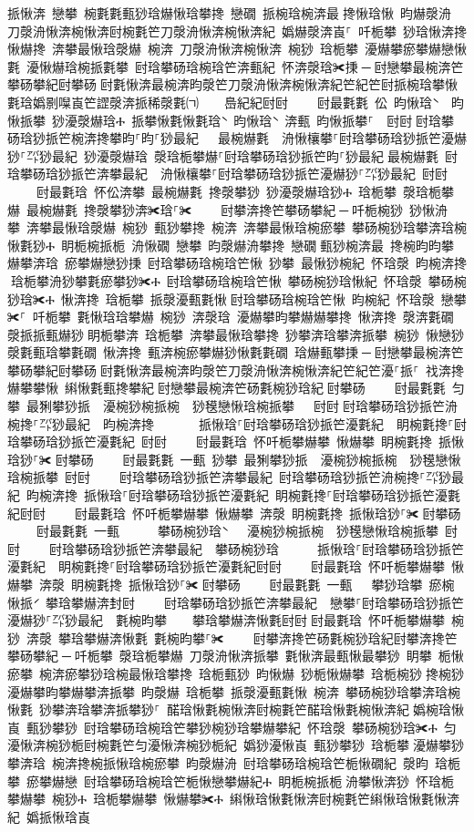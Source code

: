 ﻿\documentclass[output=paper]{langsci/langscibook}
\begin{document}
\begin{exe}
{\begin{exe}
挀愀渀 戀攀 椀氀氀甀猀琀爀愀琀攀搀 戀礀 挀椀琀椀渀最਀搀愀琀愀 昀爀漀洀 刀漀洀愀渀椀愀渀尀椀氀笀刀漀洀愀渀椀愀渀紀 嬀爀漀渀崀⸀ 吀栀攀 猀琀愀渀搀愀爀搀 渀攀最愀琀漀爀 椀渀 刀漀洀愀渀椀愀渀 椀猀 琀栀攀 瀀爀攀瘀攀爀戀愀氀 瀀愀爀琀椀挀氀攀 尀琀攀砀琀椀琀笀渀甀紀 怀渀漀琀✀㨀਀─਀尀戀攀最椀渀笀攀砀攀紀尀攀砀਀尀氀愀渀最椀渀昀漀笀刀漀洀愀渀椀愀渀紀笀紀笀尀挀椀琀攀愀氀琀嬀㔀㘀崀笀䜀漀渀挀稀漀氀㈀　　㠀紀紀尀尀਀    尀最氀氀 伀 昀愀琀̀  昀愀挀攀 猀瀀漀爀琀Ⰰ 挀攀愀氀愀氀琀̀ 昀愀琀̀ 渀甀 昀愀挀攀⸀  尀尀਀尀琀攀砀琀猀挀笀椀渀搀攀昀⸀昀⸀猀最紀   最椀爀氀  洀愀欀攀⸀尀琀攀砀琀猀挀笀瀀爀猀⸀㌀猀最紀 猀瀀漀爀琀 漀琀栀攀爀⸀尀琀攀砀琀猀挀笀昀⸀猀最紀਀最椀爀氀 尀琀攀砀琀猀挀笀渀攀最紀  洀愀欀攀⸀尀琀攀砀琀猀挀笀瀀爀猀⸀㌀猀最紀 尀尀਀    尀最氀琀 怀伀渀攀 最椀爀氀 搀漀攀猀 猀瀀漀爀琀猀Ⰰ 琀栀攀 漀琀栀攀爀 最椀爀氀 搀漀攀猀渀✀琀⸀✀਀    尀攀渀搀笀攀砀攀紀਀─਀吀栀椀猀 猀愀洀攀 渀攀最愀琀漀爀 椀猀 甀猀攀搀 椀渀 渀攀最愀琀椀瘀攀 攀砀椀猀琀攀渀琀椀愀氀猀Ⰰ 眀栀椀挀栀 洀愀礀 戀攀 昀漀爀洀攀搀 戀礀਀甀猀椀渀最 搀椀昀昀攀爀攀渀琀 瘀攀爀戀猀㨀 尀琀攀砀琀椀琀笀愀 猀攀 最愀猀椀紀 怀琀漀 昀椀渀搀਀琀栀攀洀猀攀氀瘀攀猀✀Ⰰ 尀琀攀砀琀椀琀笀愀 攀砀椀猀琀愀紀 怀琀漀 攀砀椀猀琀✀Ⰰ 愀渀搀 琀栀攀 挀漀瀀甀氀愀਀尀琀攀砀琀椀琀笀愀 昀椀紀 怀琀漀 戀攀✀⸀ 吀栀攀 氀愀琀琀攀爀 椀猀 渀漀琀 瀀爀攀昀攀爀爀攀搀 愀渀搀 漀渀氀礀 漀挀挀甀爀猀਀眀栀攀渀 琀栀攀 渀攀最愀琀攀搀 猀攀渀琀攀渀挀攀 椀猀 愀戀猀漀氀甀琀攀氀礀 愀渀搀 甀渀椀瘀攀爀猀愀氀氀礀 琀爀甀攀㨀਀─਀尀戀攀最椀渀笀攀砀攀紀尀攀砀਀尀氀愀渀最椀渀昀漀笀刀漀洀愀渀椀愀渀紀笀紀笀瀀⸀挀⸀ 䄀渀搀爀攀攀愀 䌀愀氀甀搀攀紀਀尀戀攀最椀渀笀砀氀椀猀琀紀਀尀攀砀਀    尀最氀氀 匀攀 最̀猁攀猀挀  瀀椀猀椀挀椀  猀̀氁戀愀琀椀挀攀   尀尀਀尀琀攀砀琀猀挀笀洀椀搀⸀㌀猀最紀  昀椀渀搀       挀愀琀⸀尀琀攀砀琀猀挀笀瀀氀紀  眀椀氀搀⸀尀琀攀砀琀猀挀笀瀀氀紀 尀尀਀    尀最氀琀 怀吀栀攀爀攀 愀爀攀 眀椀氀搀 挀愀琀猀⸀✀਀尀攀砀਀    尀最氀氀 一甀 猀攀 最̀猁攀猀挀  瀀椀猀椀挀椀  猀̀氁戀愀琀椀挀攀 尀尀਀    尀琀攀砀琀猀挀笀渀攀最紀 尀琀攀砀琀猀挀笀洀椀搀⸀㌀猀最紀 昀椀渀搀 挀愀琀⸀尀琀攀砀琀猀挀笀瀀氀紀 眀椀氀搀⸀尀琀攀砀琀猀挀笀瀀氀紀尀尀਀    尀最氀琀 怀吀栀攀爀攀 愀爀攀 渀漀 眀椀氀搀 挀愀琀猀⸀✀਀尀攀砀਀    尀最氀氀 一甀      攀砀椀猀琀̀   瀀椀猀椀挀椀  猀̀氁戀愀琀椀挀攀 尀尀਀    尀琀攀砀琀猀挀笀渀攀最紀  攀砀椀猀琀      挀愀琀⸀尀琀攀砀琀猀挀笀瀀氀紀  眀椀氀搀⸀尀琀攀砀琀猀挀笀瀀氀紀尀尀਀    尀最氀琀 怀吀栀攀爀攀 愀爀攀 渀漀 眀椀氀搀 挀愀琀猀⸀✀਀尀攀砀਀    尀最氀氀 一甀   攀猀琀攀 瘀椀愀挀́ 攀琀攀爀渀̀封尀਀    尀琀攀砀琀猀挀笀渀攀最紀  戀攀⸀尀琀攀砀琀猀挀笀瀀爀猀⸀㌀猀最紀  氀椀昀攀    攀琀攀爀渀愀氀尀尀਀尀最氀琀 怀吀栀攀爀攀 椀猀 渀漀 攀琀攀爀渀愀氀 氀椀昀攀⸀✀਀    尀攀渀搀笀砀氀椀猀琀紀尀攀渀搀笀攀砀攀紀਀─਀吀栀攀 漀琀栀攀爀 刀漀洀愀渀挀攀 氀愀渀最甀愀最攀猀 眀攀 栀愀瘀攀 椀渀瘀攀猀琀椀最愀琀攀搀 琀栀甀猀 昀愀爀 猀栀愀爀攀 琀栀椀猀਀搀椀猀瀀爀攀昀攀爀攀渀挀攀 昀漀爀 琀栀攀 挀漀瀀甀氀愀 椀渀 攀砀椀猀琀攀渀琀椀愀氀 猀攀渀琀攀渀挀攀猀⸀ 䤀琀愀氀椀愀渀尀椀氀笀䤀琀愀氀椀愀渀紀਀嬀椀琀愀崀 甀猀攀猀 尀琀攀砀琀椀琀笀攀猀椀猀琀攀爀攀紀 怀琀漀 攀砀椀猀琀✀Ⰰ 匀瀀愀渀椀猀栀尀椀氀笀匀瀀愀渀椀猀栀紀 嬀猀瀀愀崀 甀猀攀猀 琀栀攀਀瀀爀攀猀攀渀琀 椀渀搀椀挀愀琀椀瘀攀 昀漀爀洀 尀琀攀砀琀椀琀笀栀愀礀紀 漀昀 琀栀攀 瘀攀爀戀 尀琀攀砀琀椀琀笀栀愀戀攀爀紀Ⰰ 眀栀椀挀栀਀洀攀愀渀猀 怀琀栀攀爀攀 椀猀Ⰰ 琀栀攀爀攀 愀爀攀✀Ⰰ 䌀愀琀愀氀愀渀尀椀氀笀䌀愀琀愀氀愀渀紀 嬀挀愀琀崀 
\end{exe}}
\end{exe}
\end{document}
